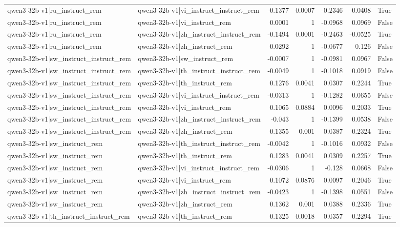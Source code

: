 \begin{table}
\begin{tabular}{l l r r r r l}
qwen3-32b-v1|ru_instruct_rem & qwen3-32b-v1|vi_instruct_instruct_rem & -0.1377 & 0.0007 & -0.2346 & -0.0408 & True \\
qwen3-32b-v1|ru_instruct_rem & qwen3-32b-v1|vi_instruct_rem & 0.0001 & 1 & -0.0968 & 0.0969 & False \\
qwen3-32b-v1|ru_instruct_rem & qwen3-32b-v1|zh_instruct_instruct_rem & -0.1494 & 0.0001 & -0.2463 & -0.0525 & True \\
qwen3-32b-v1|ru_instruct_rem & qwen3-32b-v1|zh_instruct_rem & 0.0292 & 1 & -0.0677 & 0.126 & False \\
qwen3-32b-v1|sw_instruct_instruct_rem & qwen3-32b-v1|sw_instruct_rem & -0.0007 & 1 & -0.0981 & 0.0967 & False \\
qwen3-32b-v1|sw_instruct_instruct_rem & qwen3-32b-v1|th_instruct_instruct_rem & -0.0049 & 1 & -0.1018 & 0.0919 & False \\
qwen3-32b-v1|sw_instruct_instruct_rem & qwen3-32b-v1|th_instruct_rem & 0.1276 & 0.0041 & 0.0307 & 0.2244 & True \\
qwen3-32b-v1|sw_instruct_instruct_rem & qwen3-32b-v1|vi_instruct_instruct_rem & -0.0313 & 1 & -0.1282 & 0.0655 & False \\
qwen3-32b-v1|sw_instruct_instruct_rem & qwen3-32b-v1|vi_instruct_rem & 0.1065 & 0.0884 & 0.0096 & 0.2033 & True \\
qwen3-32b-v1|sw_instruct_instruct_rem & qwen3-32b-v1|zh_instruct_instruct_rem & -0.043 & 1 & -0.1399 & 0.0538 & False \\
qwen3-32b-v1|sw_instruct_instruct_rem & qwen3-32b-v1|zh_instruct_rem & 0.1355 & 0.001 & 0.0387 & 0.2324 & True \\
qwen3-32b-v1|sw_instruct_rem & qwen3-32b-v1|th_instruct_instruct_rem & -0.0042 & 1 & -0.1016 & 0.0932 & False \\
qwen3-32b-v1|sw_instruct_rem & qwen3-32b-v1|th_instruct_rem & 0.1283 & 0.0041 & 0.0309 & 0.2257 & True \\
qwen3-32b-v1|sw_instruct_rem & qwen3-32b-v1|vi_instruct_instruct_rem & -0.0306 & 1 & -0.128 & 0.0668 & False \\
qwen3-32b-v1|sw_instruct_rem & qwen3-32b-v1|vi_instruct_rem & 0.1072 & 0.0876 & 0.0097 & 0.2046 & True \\
qwen3-32b-v1|sw_instruct_rem & qwen3-32b-v1|zh_instruct_instruct_rem & -0.0423 & 1 & -0.1398 & 0.0551 & False \\
qwen3-32b-v1|sw_instruct_rem & qwen3-32b-v1|zh_instruct_rem & 0.1362 & 0.001 & 0.0388 & 0.2336 & True \\
qwen3-32b-v1|th_instruct_instruct_rem & qwen3-32b-v1|th_instruct_rem & 0.1325 & 0.0018 & 0.0357 & 0.2294 & True \\

\end{tabular}
\end{table}
